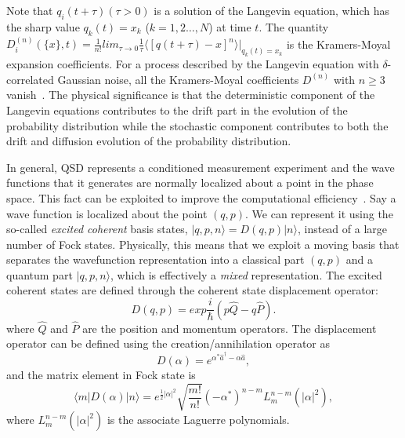 \documentclass[12pt]{wlscirep}
\begin{document}
Note that $q_i(t+\tau)(\tau>0)$ is a solution of the Langevin equation, 
which has the sharp value $q_k(t)=x_k$ ($k=1,2\dots,N$) at time $t$. The
quantity $D_i^{(n)}(\{x\},t)=\frac{1}{n!}lim_{\tau\rightarrow0}\frac{1}{\tau}
\langle[q(t+\tau)-x]^n\rangle|_{q_k(t)=x_k}$ is the Kramers-Moyal expansion 
coefficients. For a process described by the Langevin equation with 
$\delta$-correlated Gaussian noise, all the Kramers-Moyal coefficients 
$D^{(n)}$ with $n\geq3$ vanish~\cite{R:book}. The physical significance 
is that the deterministic component of the Langevin equations contributes 
to the drift part in the evolution of the probability distribution while 
the stochastic component contributes to both the drift and diffusion 
evolution of the probability distribution.

In general, QSD represents a conditioned measurement experiment and the 
wave functions that it generates are normally localized about a point in 
the phase space. This fact can be exploited to improve the computational
efficiency~\cite{SBP:1995}. Say a wave function is localized about the
point $(q,p)$. We can represent it using the so-called \emph{excited 
coherent} basis states, $|q,p,n\rangle=D(q,p)|n\rangle$, instead of 
a large number of Fock states. Physically, this means that we exploit 
a moving basis that separates the wavefunction representation into a 
classical part $(q,p)$ and a quantum part $|q,p,n\rangle$, which is 
effectively a \emph{mixed} representation. The excited coherent states 
are defined through the coherent state displacement operator:
\begin{equation*}
    D(q,p)=exp\frac{i}{\hbar}(p\hat{Q}-q\hat{P}).
\end{equation*}
where $\hat{Q}$ and $\hat{P}$ are the position and momentum operators. 
The displacement operator can be defined using the creation/annihilation 
operator as
\begin{equation*}
    D(\alpha)=e^{\alpha^*\hat{a}^\dagger-\alpha\hat{a}},
\end{equation*} 
and the matrix element in Fock state is
\begin{equation*}
    \langle m|D(\alpha)|n\rangle=e^{\frac{1}{2}|\alpha|^2}\sqrt{\frac{m!}{n!}}
    (-\alpha^*)^{n-m}L_m^{n-m}(|\alpha|^2),
\end{equation*}
where $L_m^{n-m}(|\alpha|^2)$ is the associate Laguerre polynomials.
\end{document}
